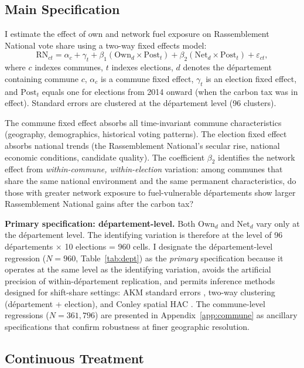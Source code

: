 \documentclass[12pt]{article}
\newcommand{\rn}{Rassemblement National}
\newcommand{\dept}{d\'{e}partement}
\newcommand{\depts}{d\'{e}partements}
\begin{document}
\subsection{Main Specification}

I estimate the effect of own and network fuel exposure on \rn{} vote share using a two-way fixed effects model:
\begin{equation}
\text{RN}_{ct} = \alpha_c + \gamma_t + \beta_1 (\text{Own}_d \times \text{Post}_t) + \beta_2 (\text{Net}_d \times \text{Post}_t) + \varepsilon_{ct},
\label{eq:main}
\end{equation}
where $c$ indexes communes, $t$ indexes elections, $d$ denotes the \dept{} containing commune $c$, $\alpha_c$ is a commune fixed effect, $\gamma_t$ is an election fixed effect, and $\text{Post}_t$ equals one for elections from 2014 onward (when the carbon tax was in effect). Standard errors are clustered at the \dept{} level (96 clusters).

The commune fixed effect absorbs all time-invariant commune characteristics (geography, demographics, historical voting patterns). The election fixed effect absorbs national trends (the \rn{}'s secular rise, national economic conditions, candidate quality). The coefficient $\beta_2$ identifies the network effect from \emph{within-commune, within-election} variation: among communes that share the same national environment and the same permanent characteristics, do those with greater network exposure to fuel-vulnerable \depts{} show larger \rn{} gains after the carbon tax?

\textbf{Primary specification: \dept{}-level.} Both $\text{Own}_d$ and $\text{Net}_d$ vary only at the \dept{} level. The identifying variation is therefore at the level of 96 \depts{} $\times$ 10 elections = 960 cells. I designate the \dept{}-level regression ($N = 960$, Table~\ref{tab:dept}) as the \emph{primary} specification because it operates at the same level as the identifying variation, avoids the artificial precision of within-\dept{} replication, and permits inference methods designed for shift-share settings: AKM standard errors \citep{adao2019shift}, two-way clustering (\dept{} + election), and Conley spatial HAC \citep{conley1999gmm}. The commune-level regressions ($N = 361{,}796$) are presented in Appendix~\ref{app:commune} as ancillary specifications that confirm robustness at finer geographic resolution.

\subsection{Continuous Treatment}
\end{document}
